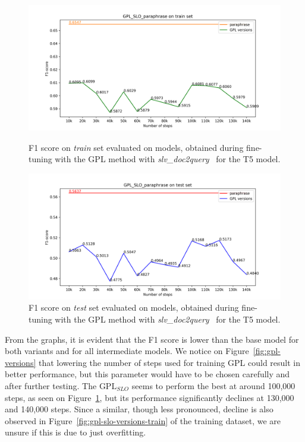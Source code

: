 \documentclass[fleqn,moreauthors,10pt]{ds_report}
\begin{document}
\begin{figure}
    \centering
    \begin{minipage}{0.5\textwidth}
        \centering
        \includegraphics[width=\linewidth]{graphs/GPL_SLO_paraphrase_train.png}
        \caption{F1 score on \textit{train} set evaluated on models, obtained during fine-tuning with the GPL method with {\it slv\_doc2query}~\cite{boshko} for the T5 model.}
		\label{fig:gpl-slo-versions-train}
    \end{minipage}\hfill
    \begin{minipage}{0.5\textwidth}
        \centering
        \includegraphics[width=\linewidth]{graphs/GPL_SLO_paraphrase_test.png}
        \caption{F1 score on \textit{test} set evaluated on models, obtained during fine-tuning with the GPL method with {\it slv\_doc2query}~\cite{boshko} for the T5 model.}
		\label{fig:gpl-slo-versions}
    \end{minipage}
\end{figure}

From the graphs, it is evident that the F1 score is lower than the base model for both variants and for all intermediate models. We notice on Figure~\ref{fig:gpl-versions} that lowering the number of steps used for training GPL could result in better performance, but this parameter would have to be chosen carefully and after further testing. The $\text{GPL}_{SLO}$ seems to perform the best at around 100,000 steps, as seen on Figure~\ref{fig:gpl-slo-versions}, but its performance significantly declines at 130,000 and 140,000 steps. Since a similar, though less pronounced, decline is also observed in Figure~\ref{fig:gpl-slo-versions-train} of the training dataset, we are unsure if this is due to just overfitting.
\end{document}
